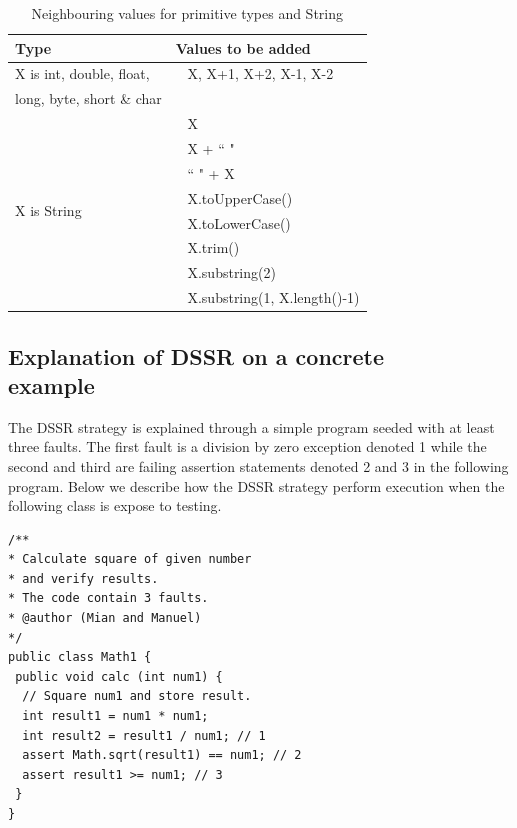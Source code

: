 \documentclass{acm_proc_article-sp}
\begin{document}
\begin{table}[ht]
\caption{Neighbouring values for primitive types and String} %
\centering %
\begin{tabular}{| l | l |} %
\hline\hline %
Type & Values to be added\\ [0.5ex] %
\hline %
\multirow{1}{*}{X is int, double, float, } & ~ X,  X+1, X+2, X-1, X-2 \\ %
\multirow{1}{*}{long, byte, short \& char} &  \\ 

\hline
\multirow{8}{*}{X is String} & ~ X\\ %

& ~ X + ``  "\\ %
& ~ ``  " + X \\ %
& ~ X.toUpperCase() \\
& ~ X.toLowerCase() \\
& ~ X.trim() \\
& ~ X.substring(2) \\
& ~ X.substring(1, X.length()-1) \\[1ex]
\hline
\hline %
\end{tabular}
\bigskip
\label{table:addvalues} %
\end{table}







\subsection{Explanation of DSSR on a concrete \\ example}
The DSSR strategy is explained through a simple program seeded with at least three faults. The first fault is a division by zero exception denoted 1 while the second and third are failing assertion statements denoted 2 and 3 in the following program.  Below we describe how the DSSR strategy perform execution when the following class is expose to testing.

\begin{lstlisting}
/** 
* Calculate square of given number 
* and verify results. 
* The code contain 3 faults.
* @author (Mian and Manuel)
*/
public class Math1 {
 public void calc (int num1) {
  // Square num1 and store result. 
  int result1 = num1 * num1;
  int result2 = result1 / num1; // 1
  assert Math.sqrt(result1) == num1; // 2
  assert result1 >= num1; // 3
 } 
}
\end{lstlisting}
\end{document}
